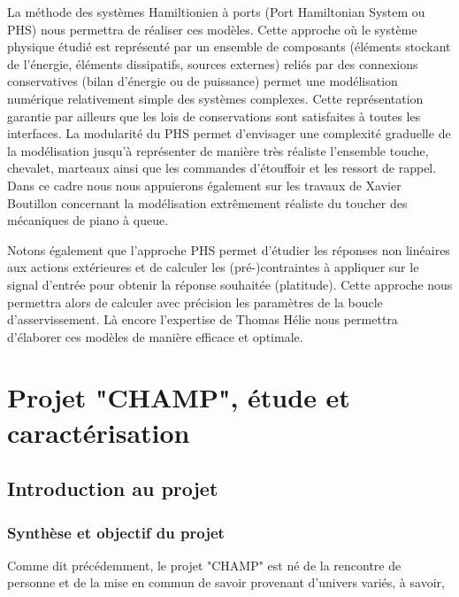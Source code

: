 \documentclass[french,a4paper,12pt]{report}
\begin{document}
La méthode des systèmes Hamiltionien à ports (Port Hamiltonian System ou PHS) nous permettra de réaliser ces modèles. Cette approche où le système physique étudié est représenté par un ensemble de composants (éléments stockant de l’énergie, éléments dissipatifs, sources externes) reliés par des connexions conservatives (bilan d’énergie ou de puissance) permet une modélisation numérique relativement simple des systèmes complexes. Cette représentation garantie par ailleurs que les lois de conservations sont satisfaites à toutes les interfaces. La modularité du PHS permet d’envisager une complexité graduelle de la modélisation jusqu’à représenter de manière très réaliste l’ensemble touche, chevalet, marteaux ainsi que les commandes d’étouffoir et les ressort de rappel. Dans ce cadre nous nous appuierons également sur les travaux de Xavier Boutillon concernant la modélisation extrêmement réaliste du toucher des mécaniques de piano à queue.

Notons également que l’approche PHS permet d’étudier les réponses non linéaires aux actions extérieures et de calculer les (pré-)contraintes à appliquer sur le signal d’entrée pour obtenir la réponse souhaitée (platitude). Cette approche nous permettra alors de calculer avec précision les paramètres de la boucle d’asservissement. Là encore l’expertise de Thomas Hélie nous permettra d’élaborer ces modèles de manière efficace et optimale.



%
%
\part{Projet "CHAMP", étude et caractérisation}

	\chapter{Introduction au projet}
	
	\section{Synthèse et objectif du projet}
	
	Comme dit précédemment, le projet "CHAMP" est né de la rencontre de personne et de la mise en commun de savoir provenant d'univers variés, à savoir, 
	
\end{document}
